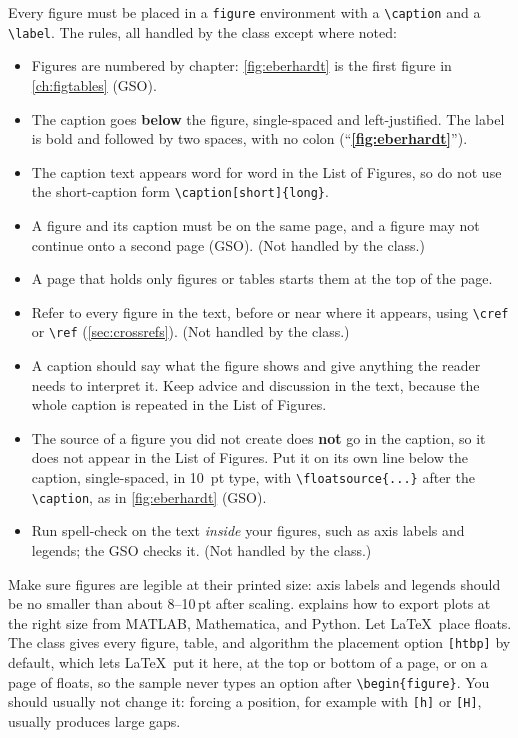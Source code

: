 Every figure must be placed in a \texttt{figure} environment with a \verb+\caption+ and a \verb+\label+. The rules, all handled by the class except where noted:
\begin{itemize}
\item Figures are numbered by chapter: \cref{fig:eberhardt} is the first figure in \cref{ch:figtables} (GSO).
\item The caption goes \textbf{below} the figure, single-spaced and left-justified. The label is bold and followed by two spaces, with no colon (``\textbf{\cref{fig:eberhardt}}'').
\item The caption text appears word for word in the List of Figures, so do not use the short-caption form \verb+\caption[short]{long}+.
\item A figure and its caption must be on the same page, and a figure may not continue onto a second page (GSO). (Not handled by the class.)
\item A page that holds only figures or tables starts them at the top of the page.
\item Refer to every figure in the text, before or near where it appears, using \verb+\cref+ or \verb+\ref+ (\cref{sec:crossrefs}). (Not handled by the class.)
\item A caption should say what the figure shows and give anything the reader needs to interpret it. Keep advice and discussion in the text, because the whole caption is repeated in the List of Figures.
\item The source of a figure you did not create does \textbf{not} go in the caption, so it does not appear in the List of Figures. Put it on its own line below the caption, single-spaced, in 10~pt type, with \verb+\floatsource{...}+ after the \verb+\caption+, as in \cref{fig:eberhardt} (GSO).
\item Run spell-check on the text \emph{inside} your figures, such as axis labels and legends; the GSO checks it. (Not handled by the class.)
\end{itemize}
Make sure figures are legible at their printed size: axis labels and legends should be no smaller than about 8--10\,pt after scaling.  explains how to export plots at the right size from MATLAB, Mathematica, and Python. Let \LaTeX\ place floats. The class gives every figure, table, and algorithm the placement option \verb+[htbp]+ by default, which lets \LaTeX\ put it here, at the top or bottom of a page, or on a page of floats, so the sample never types an option after \verb+\begin{figure}+. You should usually not change it: forcing a position, for example with \verb+[h]+ or \verb+[H]+, usually produces large gaps.


